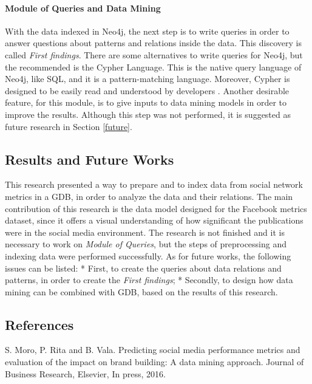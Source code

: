 \paragraph{Module of Queries and Data
Mining}\label{module-of-queries-and-data-mining}

With the data indexed in Neo4j, the next step is to write queries in
order to answer questions about patterns and relations inside the data.
This discovery is called \emph{First findings}. There are some
alternatives to write queries for Neo4j, but the recommended is the
Cypher Language. This is the native query language of Neo4j, like SQL,
and it is a pattern-matching language. Moreover, Cypher is designed to
be easily read and understood by developers \cite{graphDB}. Another
desirable feature, for this module, is to give inputs to data mining
models in order to improve the results. Although this step was not
performed, it is suggested as future research in Section \ref{future}.

\subsection{Results and Future Works}\label{results-and-future-works}

This research presented a way to prepare and to index data from social
network metrics in a GDB, in order to analyze the data and their
relations. The main contribution of this research is the data model
designed for the Facebook metrics dataset, since it offers a visual
understanding of how significant the publications were in the social
media environment. The research is not finished and it is necessary to
work on \emph{Module of Queries}, but the steps of preprocessing and
indexing data were performed successfully. As for future works, the
following issues can be listed: * First, to create the queries about
data relations and patterns, in order to create the \emph{First
findings}; * Secondly, to design how data mining can be combined with
GDB, based on the results of this research.

\subsection{References}\label{references}

S. Moro, P. Rita and B. Vala. Predicting social media performance
metrics and evaluation of the impact on brand building: A data mining
approach. Journal of Business Research, Elsevier, In press, 2016.
